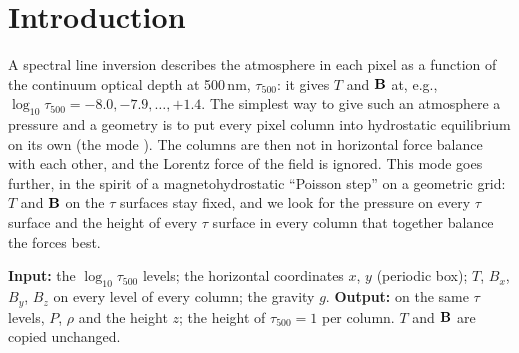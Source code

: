 


\begin{abstract}
\noindent An inversion of solar spectra gives the temperature and the magnetic field on surfaces of constant optical depth.
This mode computes the gas pressure on every optical-depth surface \emph{and} the geometric height of every surface in every
pixel column such that pressure, gravity and the Lorentz force of the given field balance as well as possible in all three
directions. On an optical-depth grid the two cannot be separated: the heights of the surfaces follow from the opacity, which
depends on the pressure. We derive the vertical and horizontal force balance on tilted optical-depth surfaces, the Lorentz
force in these curvilinear coordinates, and the least-squares objective; we then describe the Gauss--Newton
(Levenberg--Marquardt) iteration with its exact linearisation, the preconditioner, the step control and the stopping rule.
We discuss what fixes the pressure level (no external reference pressure is used), what fixes the heights, and which
quantities remain undetermined. All assumptions are listed.
\end{abstract}

\section{Introduction}
A spectral line inversion describes the atmosphere in each pixel as a function of the continuum optical depth at 500\,nm,
$\tau_{500}$: it gives $T$ and $\mathbf B$ at, e.g., $\log_{10}\tau_{500}=-8.0,-7.9,\dots,+1.4$. The simplest way to give such an
atmosphere a pressure and a geometry is to put every pixel column into hydrostatic equilibrium on its own (the mode
). The columns are then not in horizontal force balance with each other, and the Lorentz force of the
field is ignored. This mode goes further, in the spirit of a magnetohydrostatic ``Poisson step'' on a geometric grid: $T$ and
$\mathbf B$ on the $\tau$ surfaces stay fixed, and we look for the pressure on every $\tau$ surface and the height of every $\tau$
surface in every column that together balance the forces best.

\textbf{Input:} the $\log_{10}\tau_{500}$ levels; the horizontal coordinates $x$, $y$ (periodic box); $T$, $B_x$, $B_y$, $B_z$
on every level of every column; the gravity $g$. \textbf{Output:} on the same $\tau$ levels, $P$, $\rho$ and the height $z$;
the height of $\tau_{500}=1$ per column. $T$ and $\mathbf B$ are copied unchanged.

